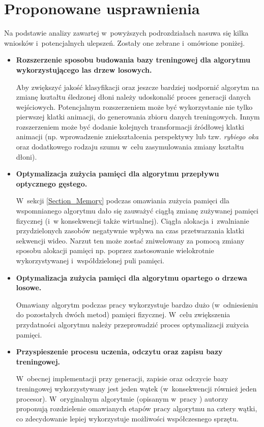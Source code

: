   \section{Proponowane usprawnienia}\label{Section_Usprawnienia}

    Na podstawie analizy zawartej w~powyższych podrozdziałach nasuwa się kilka wniosków i~potencjalnych ulepszeń. Zostały one zebrane i~omówione poniżej.

    \begin{itemize}
      \item \textbf{Rozszerzenie sposobu budowania bazy treningowej dla algorytmu wykorzystującego las drzew losowych.}

      Aby zwiększyć jakość klasyfikacji oraz jeszcze bardziej uodpornić algorytm na zmianę kształtu śledzonej dłoni należy udoskonalić proces generacji danych wejściowych. Potencjalnym rozszerzeniem może być wykorzystanie nie tylko pierwszej klatki animacji, do generowania zbioru danych treningowych. Innym rozszerzeniem może być dodanie kolejnych transformacji źródłowej klatki animacji (np. wprowadzenie zniekształcenia perspektywy lub tzw. \textit{rybiego oka} oraz dodatkowego rodzaju szumu w~celu zasymulowania zmiany kształtu dłoni).

      \item \textbf{Optymalizacja zużycia pamięci dla algorytmu przepływu optycznego gęstego.}

      W~sekcji \ref{Section_Memory} podczas omawiania zużycia pamięci dla wspomnianego algorytmu dało się zauważyć ciągłą zmianę zużywanej pamięci fizycznej (i~w konsekwencji także wirtualnej). Ciągła alokacja i~zwalnianie przydzielonych zasobów negatywnie wpływa na czas przetwarzania klatki sekwencji wideo. Narzut ten może zostać zniwelowany za pomocą zmiany sposobu alokacji pamięci np. poprzez zastosowanie wielokrotnie wykorzystywanej i~współdzielonej puli pamięci.

      \item \textbf{Optymalizacja zużycia pamięci dla algorytmu opartego o drzewa losowe.}

      Omawiany algorytm podczas pracy wykorzystuje bardzo dużo (w~odniesieniu do pozostałych dwóch metod) pamięci fizycznej. W~celu zwiększenia przydatności algorytmu należy przeprowadzić proces optymalizacji zużycia pamięci.

      \item \textbf{Przyspieszenie procesu uczenia, odczytu oraz zapisu bazy treningowej.}

       W~obecnej implementacji przy generacji, zapisie oraz odczycie bazy treningowej wykorzystywany jest jeden wątek (w~konsekwencji również jeden procesor). W~oryginalnym algorytmie (opisanym w~pracy \cite{RandomizedTrees06}) autorzy proponują rozdzielenie omawianych etapów pracy algorytmu na cztery wątki, co zdecydowanie lepiej wykorzystuje możliwości współczesnego sprzętu.
    \end{itemize}

